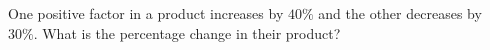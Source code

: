 One positive factor in a product increases by $40\%$ and the other decreases by $30\%$. What is the percentage change in their product?
